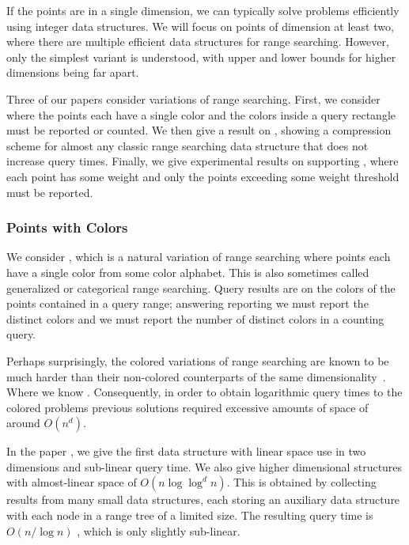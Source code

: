 If the points are in a single dimension, we can typically solve problems efficiently using integer data structures. We will focus on points of dimension at least two, where there are multiple efficient data structures for range searching. However, only the simplest variant is understood, with upper and lower bounds for higher dimensions being far apart.

Three of our papers consider variations of range searching. First, we consider  where the points each have a single color and the colors inside a query rectangle must be reported or counted. We then give a result on , showing a compression scheme for almost any classic range searching data structure that does not increase query times. Finally, we give experimental results on supporting , where each point has some weight and only the points exceeding some weight threshold must be reported. 


\clearpage
\subsubsection{Points with Colors}
We consider , which is a natural variation of range searching where points each have a single color from some color alphabet. This is also sometimes called generalized or categorical range searching. Query results are on the colors of the points contained in a query range; answering reporting we must report the distinct colors and we must report the number of distinct colors in a counting query.

Perhaps surprisingly, the colored variations of range searching are known to be much harder than their non-colored counterparts of the same dimensionality~. Where we know . Consequently, in order to obtain logarithmic query times to the colored problems previous solutions required excessive amounts of space of around $O(n^d)$. 

In the paper , we give the first data structure with linear space use in two dimensions and sub-linear query time. We also give higher dimensional structures with almost-linear space of $O(n \log \log^d n)$. This is obtained by collecting results from many small data structures, each storing an auxiliary data structure with each node in a range tree of a limited size. The resulting query time is $O(n / \log n)$ , which is only slightly sub-linear.

